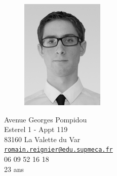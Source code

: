 \documentclass[a4paper,11pt,final]{memoir}
\begin{document}
\begin{figure}
	\hfill
	\includegraphics[width=0.5\columnwidth]{../IMG_7936-Modifier_cv}
	\vspace{-0.5cm}
\end{figure}

\begin{flushright}\small
	Avenue Georges Pompidou\\
	Esterel 1 - Appt 119\\
	83160 La Valette du Var\\
	{\footnotesize\href{mailto:romain.reignier@edu.supmeca.fr}{\nolinkurl{romain.reignier@edu.supmeca.fr}}}\\
	06 09 52 16 18\\
	23 ans
\end{flushright}%
\end{document}
